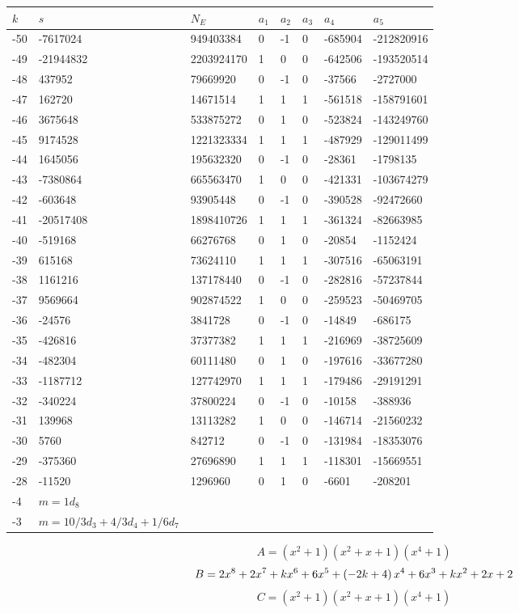 \documentclass{amsart}
\begin{document}
\begin{longtable}{|l|l|l|lllll|}
\hline
$k$ & $s$ & $N_E$ & $a_1$ & $a_2$ & $a_3$ & $a_4$ & $a_5$\\
\hline
-50&-7617024&949403384&0&-1&0&-685904&-212820916\\
-49&-21944832&2203924170&1&0&0&-642506&-193520514\\
-48&437952&79669920&0&-1&0&-37566&-2727000\\
-47&162720&14671514&1&1&1&-561518&-158791601\\
-46&3675648&533875272&0&1&0&-523824&-143249760\\
-45&9174528&1221323334&1&1&1&-487929&-129011499\\
-44&1645056&195632320&0&-1&0&-28361&-1798135\\
-43&-7380864&665563470&1&0&0&-421331&-103674279\\
-42&-603648&93905448&0&-1&0&-390528&-92472660\\
-41&-20517408&1898410726&1&1&1&-361324&-82663985\\
-40&-519168&66276768&0&1&0&-20854&-1152424\\
-39&615168&73624110&1&1&1&-307516&-65063191\\
-38&1161216&137178440&0&-1&0&-282816&-57237844\\
-37&9569664&902874522&1&0&0&-259523&-50469705\\
-36&-24576&3841728&0&-1&0&-14849&-686175\\
-35&-426816&37377382&1&1&1&-216969&-38725609\\
-34&-482304&60111480&0&1&0&-197616&-33677280\\
-33&-1187712&127742970&1&1&1&-179486&-29191291\\
-32&-340224&37800224&0&-1&0&-10158&-388936\\
-31&139968&13113282&1&0&0&-146714&-21560232\\
-30&5760&842712&0&-1&0&-131984&-18353076\\
-29&-375360&27696890&1&1&1&-118301&-15669551\\
-28&-11520&1296960&0&1&0&-6601&-208201\\
-4&$m=1d_{8}$&&\multicolumn{5}{c|}{}\\
-3&$m=10/3d_{3}+4/3d_{4}+1/6d_{7}$&&\multicolumn{5}{c|}{}\\
\hline
\end{longtable}
$$A=(x^2
 + 1)(x^2
 + x
 + 1)(x^4
 + 1)$$
$$B=2\*x^8
 + 2\*x^7
 + k\*x^6
 + 6\*x^5
 + \left(-2\*k
 + 4\right) \*x^4
 + 6\*x^3
 + k\*x^2
 + 2\*x
 + 2$$
$$C=(x^2
 + 1)(x^2
 + x
 + 1)(x^4
 + 1)$$
\end{document}
